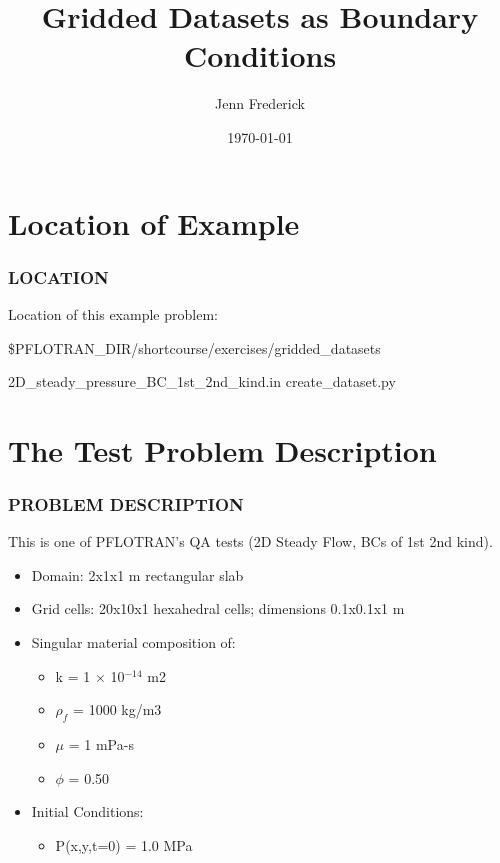 \documentclass{beamer}
\begin{document}
\title{Gridded Datasets as Boundary Conditions}
\author{Jenn Frederick}
\date{\today}


\section{Location of Example}

\begin{frame}\frametitle{LOCATION}

Location of this example problem:

\begin{semiverbatim}
\$PFLOTRAN_DIR/shortcourse/exercises/gridded_datasets

2D_steady_pressure_BC_1st_2nd_kind.in
create_dataset.py
\end{semiverbatim}

\end{frame}

\section{The Test Problem Description}

\begin{frame}\frametitle{PROBLEM DESCRIPTION}

This is one of PFLOTRAN's QA tests (2D Steady Flow, BCs of 1st 2nd kind).
  \begin{itemize}
    \item Domain: 2x1x1 m rectangular slab
    \item Grid cells: 20x10x1 hexahedral cells; dimensions 0.1x0.1x1 m
    \item Singular material composition of:
    \begin{itemize}
      \item k = 1 $\times$ 10$^{-14}$ m2
      \item $\rho_{f}$ = 1000 kg/m3
      \item $\mu$ = 1 mPa-s
      \item $\phi$ = 0.50
    \end{itemize}
    \item Initial Conditions:
    \begin{itemize}
      \item P(x,y,t=0) = 1.0 MPa
    \end{itemize}
    
  \end{itemize}

\end{frame}
\end{document}
